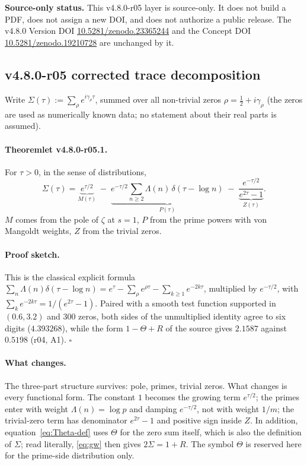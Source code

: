 \noindent\textbf{Source-only status.}
This v4.8.0-r05 layer is source-only.  It does not build a PDF, does not assign a new DOI,
and does not authorize a public release.  The v4.8.0 Version DOI
\href{https://doi.org/10.5281/zenodo.23365244}{10.5281/zenodo.23365244} and the Concept DOI
\href{https://doi.org/10.5281/zenodo.19210728}{10.5281/zenodo.19210728} are unchanged by it.

\subsection*{v4.8.0-r05 corrected trace decomposition}
\label{subsec:v480-r05-trace-decomposition}

Write \(\Sigma(\tau):=\sum_\rho e^{i\gamma_\rho\tau}\), summed over all non-trivial zeros
\(\rho=\tfrac12+i\gamma_\rho\) (the zeros are used as numerically known data; no statement about
their real parts is assumed).

\paragraph{Theoremlet v4.8.0-r05.1.}
For \(\tau>0\), in the sense of distributions,
\[
\Sigma(\tau)
=\underbrace{e^{\tau/2}}_{M(\tau)}
\;-\;\underbrace{e^{-\tau/2}\sum_{n\ge2}\Lambda(n)\,\delta(\tau-\log n)}_{P(\tau)}
\;-\;\underbrace{\frac{e^{-\tau/2}}{e^{2\tau}-1}}_{Z(\tau)} .
\]
\(M\) comes from the pole of \(\zeta\) at \(s=1\), \(P\) from the prime powers with von Mangoldt
weights, \(Z\) from the trivial zeros.

\paragraph{Proof sketch.}
This is the classical explicit formula
\(\sum_n\Lambda(n)\delta(\tau-\log n)=e^\tau-\sum_\rho e^{\rho\tau}-\sum_{k\ge1}e^{-2k\tau}\),
multiplied by \(e^{-\tau/2}\), with \(\sum_k e^{-2k\tau}=1/(e^{2\tau}-1)\).  Paired with a smooth
test function supported in \((0.6,3.2)\) and 300 zeros, both sides of the unmultiplied identity
agree to six digits (\(4.393268\)), while the form \(1-\Theta+R\) of the source gives
\(2.1587\) against \(0.5198\) (r04, A1).  \(\square\)

\paragraph{What changes.}
The three-part structure survives: pole, primes, trivial zeros.  What changes is every
functional form.  The constant \(1\) becomes the growing term \(e^{\tau/2}\); the primes enter with
weight \(\Lambda(n)=\log p\) and damping \(e^{-\tau/2}\), not with weight \(1/m\); the trivial-zero
term has denominator \(e^{2\tau}-1\) and positive sign inside \(Z\).  In addition,
equation~\eqref{eq:Theta-def} uses \(\Theta\) for the zero sum itself, which is also the
definition of \(\Sigma\); read literally, \eqref{eq:gw} then gives \(2\Sigma=1+R\).  The symbol
\(\Theta\) is reserved here for the prime-side distribution only.

